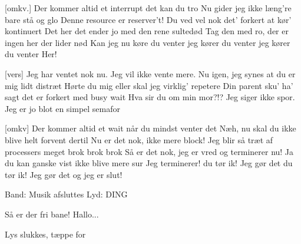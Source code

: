 \documentclass[a4paper,11pt]{article}
\begin{document}
\begin{song}
[omkv.] Der kommer altid et interrupt det kan du tro
 Nu gider jeg ikke læng're bare stå og glo
 Denne resource er reserver't!
          Du ved vel nok det' forkert at kør' kontinuert
 Det her det ender jo med den rene sultedød
 Tag den med ro, der er ingen her der lider nød
 Kan jeg nu køre
 du venter
 jeg kører
 du venter
 jeg kører
 du venter Her!

[vers] Jeg har ventet nok nu. Jeg vil ikke vente mere.
 Nu igen, jeg synes at du er mig lidt distræt
 Hørte du mig eller skal jeg virklig' repetere
 Din parent sku' ha' sagt det er forkert med busy wait
 Hva sir du om min mor?!?
 Jeg siger ikke spor. Jeg er jo blot en simpel semafor

[omkv] Der kommer altid et wait når du mindst venter det
 Næh, nu skal du ikke blive helt forvent dertil
          Nu er det nok, ikke mere block!
 Jeg blir så træt af processers meget brok brok brok
 Så er det nok, jeg er vred og terminerer nu!
 Ja du kan ganske vist ikke blive mere sur
 Jeg terminerer!
 du tør ik!
 Jeg gør det
 du tør ik!
 Jeg gør det og jeg er slut! 

\scene Band: Musik afsluttes
\scene Lyd: DING

 
 Så er der fri bane!
 Hallo...

\scene Lys slukkes, tæppe for

\end{song}
\end{document}
